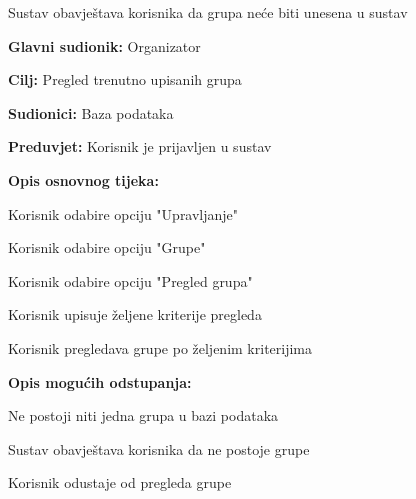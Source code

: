 \begin{packed_item}
\begin{packed_item}
\begin{packed_item}
\begin{packed_enum}
								\item Sustav obavještava korisnika da grupa neće biti unesena u sustav
								
							\end{packed_enum}
							
						\end{packed_item}
					\end{packed_item}
					
					\noindent {}
					\begin{packed_item}
						
						\item \textbf{Glavni sudionik: }Organizator
						\item  \textbf{Cilj:} Pregled trenutno upisanih grupa
						\item  \textbf{Sudionici:} Baza podataka
						\item  \textbf{Preduvjet:} Korisnik je prijavljen u sustav
						\item  \textbf{Opis osnovnog tijeka:}
						
						\item[] \begin{packed_enum}
							
							\item Korisnik odabire opciju "Upravljanje"
							\item Korisnik odabire opciju "Grupe"
							\item Korisnik odabire opciju "Pregled grupa"
							\item Korisnik upisuje željene kriterije pregleda
							\item Korisnik pregledava grupe po željenim kriterijima
						\end{packed_enum}
						
						\item  \textbf{Opis mogućih odstupanja:}
						
						\item[] \begin{packed_item}
							
							\item[2.a] Ne postoji niti jedna grupa u bazi podataka
							\item[] \begin{packed_enum}
								
								\item Sustav obavještava korisnika da ne postoje grupe
								\item Korisnik odustaje od pregleda grupe
								

\end{packed_enum}
\end{packed_item}
\end{packed_item}
\end{packed_item}

